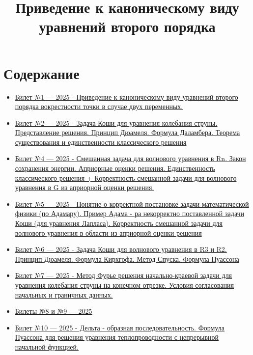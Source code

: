 \documentclass[12pt, a4paper]{article}
\title{Приведение к каноническому виду уравнений второго порядка}
\author{} %
\date{}   %
\begin{document}

\section*{Содержание}\label{toc}
\begin{itemize}
  \item \hyperref[sec:ticket1]{Билет №1 — 2025 - Приведение к каноническому виду уравнений второго порядка вокрестности точки в случае двух переменных.}
  
  \item \hyperref[sec:ticket2]{Билет №2 — 2025 -   Задача Коши для уравнения колебания струны. Представление решения. Принцип Дюамеля. Формула Даламбера. Теорема существования и единственности классического решения}

  \item \hyperref[sec:ticket4]{Билет №4 — 2025 - Смешанная задача для волнового уравнения в Rn. Закон сохранения энергии. Априорные оценки решения. Единственность классического решения + Корректность смешанной задачи для волнового уравнения в G из априорной оценки решения.}
  
  \item \hyperref[sec:ticket5]{Билет №5 — 2025 - Понятие о корректной постановке задачи математической физики (по Адамару). Пример Адама - ра некорректно поставленной задачи Коши (для уравнения Лапласа). Корректность смешанной
задачи для волнового уравнения в области из априорной оценки
решения}
  
  \item \hyperref[sec:ticket6]{Билет №6 — 2025 - Задача Коши для волнового уравнения в R3 и R2. Принцип Дюамеля. Формула Кирхгофа. Метод Спуска.
Формула Пуассона}
  
  \item \hyperref[sec:ticket7]{Билет №7 — 2025 - Метод Фурье решения начально-краевой задачи для уравнения колебания струны на конечном отрезке. Условия согласования начальных и граничных данных.}
  
  \item \hyperref[sec:ticket8_9]{Билеты №8 и №9 — 2025}
  \item \hyperref[sec:ticket10]{Билет №10 — 2025 -   Дельта - образная последовательность. Формула Пуассона для решения уравнения теплопроводности с непрерывной начальной функцией. }


\end{itemize}
\end{document}

